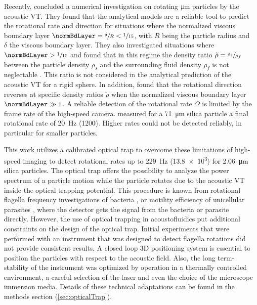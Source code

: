 Recently, \citeauthor{hahn2016} \cite{hahn2016} concluded a numerical 
investigation on rotating \si{\micro\meter} particles by the acoustic VT\@. They 
found that the analytical models are a reliable tool to predict the rotational 
rate and direction for situations where the normalized viscous boundary layer 
$\normBdLayer = \sfrac{\delta}{R} < \sfrac{1}{15}$, with $R$ being the particle 
radius and $\delta$ the viscous boundary layer. They also investigated 
situations where $\normBdLayer > \sfrac{1}{15}$ and found that in this regime 
the density ratio $\tilde{\rho} = \sfrac{\rho_{s}}{\rho_{f}}$ between the 
particle density $\rho_{s}$ and the surrounding fluid density $\rho_{f}$ is not 
neglectable \cite{hahn2016}. This ratio is not considered in the analytical 
prediction of the acoustic VT for a rigid sphere. In addition, 
\citeauthor{hahn2016} \cite{hahn2016} found that the rotational direction 
reverses at specific density ratios $\tilde{\rho}$ when the normalized viscous 
boundary layer $\normBdLayer \gg 1$. A reliable detection of the rotational rate 
$\Omega$ is limited by the frame rate of the high-speed camera.  
\citeauthor{Lamprecht} \cite{Lamprecht} measured for a \SI{71}{\micro\meter} 
silica particle a final rotational rate of \SI{20}{\hertz} (\SI{1200}{\rpm}).  
Higher rates could not be detected reliably, in particular for smaller 
particles.

This work utilizes a calibrated optical trap to overcome these limitations of 
high-speed imaging to detect rotational rates up to \SI{229}{\hertz} 
(\SI{13.8e3}{\rpm}) for \SI{2.06}{\micro\meter} silica particles. The optical 
trap offers the possibility to analyze the power spectrum of a particle motion 
while the particle rotates due to the acoustic VT inside the optical trapping 
potential.  This procedure is known from rotational flagella frequency 
investigations of bacteria \cite{kirchner2014direct}, or motility efficiency of 
unicellular parasites \cite{stellamanns2014optical}, where the detector gets the 
signal from the bacteria or parasite directly. However, the use of optical 
trapping in acoustofluidics put additional constraints on the design of the 
optical trap.  Initial experiments that were performed with an instrument that 
was designed to detect flagella rotations did not provide consistent results. A 
closed loop 3D positioning system is essential to position the particles with 
respect to the acoustic field. Also, the long term-stability of the instrument 
was optimized by operation in a thermally controlled environment, a careful 
selection of the laser and even the choice of the microscope immersion media.  
Details of these technical adaptations can be found in the methods section 
(\ref{sec:opticalTrap}).

